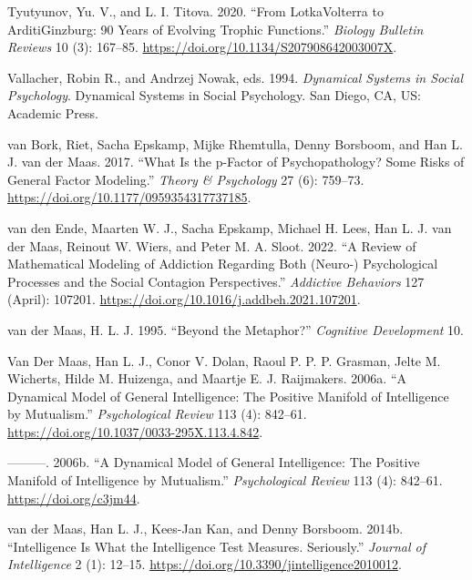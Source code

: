 \documentclass[
  a4paper,
  DIV=11,
  numbers=noendperiod,
  oneside]{scrreprt}
\newlength{\cslhangindent}
\newlength{\cslentryspacingunit} %
\newenvironment{CSLReferences}[2] %
 {%
  \setlength{\parindent}{0pt}
  \ifodd #1
  \let\oldpar\par
  \def\par{\hangindent=\cslhangindent\oldpar}
  \fi
  \setlength{\parskip}{#2\cslentryspacingunit}
 }%
 {}
\begin{document}
\begin{CSLReferences}{1}{0}
\leavevmode{}%
Tyutyunov, Yu. V., and L. I. Titova. 2020. {``From
Lotka{\textendash}Volterra to Arditi{\textendash}Ginzburg: 90 Years of
Evolving Trophic Functions.''} \emph{Biology Bulletin Reviews} 10 (3):
167--85. \url{https://doi.org/10.1134/S207908642003007X}.

\leavevmode{}%
Vallacher, Robin R., and Andrzej Nowak, eds. 1994. \emph{Dynamical
Systems in Social Psychology}. Dynamical Systems in Social Psychology.
{San Diego, CA, US}: {Academic Press}.

\leavevmode{}%
van Bork, Riet, Sacha Epskamp, Mijke Rhemtulla, Denny Borsboom, and Han
L. J. van der Maas. 2017. {``What Is the p-Factor of Psychopathology?
{Some} Risks of General Factor Modeling.''} \emph{Theory \& Psychology}
27 (6): 759--73. \url{https://doi.org/10.1177/0959354317737185}.

\leavevmode{}%
van den Ende, Maarten W. J., Sacha Epskamp, Michael H. Lees, Han L. J.
van der Maas, Reinout W. Wiers, and Peter M. A. Sloot. 2022. {``A Review
of Mathematical Modeling of Addiction Regarding Both (Neuro-)
Psychological Processes and the Social Contagion Perspectives.''}
\emph{Addictive Behaviors} 127 (April): 107201.
\url{https://doi.org/10.1016/j.addbeh.2021.107201}.

\leavevmode{}%
van der Maas, H. L. J. 1995. {``Beyond the Metaphor?''} \emph{Cognitive
Development} 10.

\leavevmode{}%
Van Der Maas, Han L. J., Conor V. Dolan, Raoul P. P. P. Grasman, Jelte
M. Wicherts, Hilde M. Huizenga, and Maartje E. J. Raijmakers. 2006a.
{``A Dynamical Model of General Intelligence: The Positive Manifold of
Intelligence by Mutualism.''} \emph{Psychological Review} 113 (4):
842--61. \url{https://doi.org/10.1037/0033-295X.113.4.842}.

\leavevmode{}%
---------. 2006b. {``A Dynamical Model of General Intelligence: {The}
Positive Manifold of Intelligence by Mutualism.''} \emph{Psychological
Review} 113 (4): 842--61. \url{https://doi.org/c3jm44}.

\leavevmode{}%
van der Maas, Han L. J., Kees-Jan Kan, and Denny Borsboom. 2014b.
{``Intelligence {Is What} the {Intelligence Test Measures}.
{Seriously}.''} \emph{Journal of Intelligence} 2 (1): 12--15.
\url{https://doi.org/10.3390/jintelligence2010012}.


\end{CSLReferences}
\end{document}
